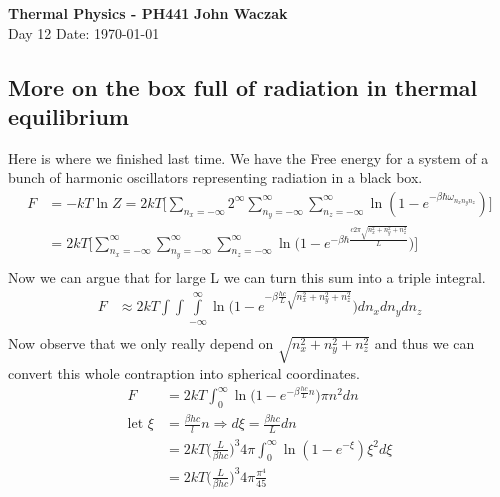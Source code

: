 \documentclass[a4paper, 11pt]{article}
\begin{document}
\noindent
\large\textbf{Thermal Physics - PH441} \hfill \textbf{John Waczak} \\
\normalsize Day 12 \hfill  Date: \today \\


\subsection*{More on the box full of radiation in thermal equilibrium}
	Here is where we finished last time. We have the Free energy for a system of a bunch of harmonic oscillators representing radiation in a black box.
		\begin{align*}
			F &= -kT\ln Z = 2kT\Big[\sum\limits_{n_x=-\infty}2^\infty\sum\limits_{n_y=-\infty}^\infty\sum\limits_{n_z=-\infty}^\infty\ln(1-e^{-\beta\hbar\omega_{n_xn_yn_z}})\Big]\\
			&= 2kT\Big[\sum\limits_{n_x=-\infty}^\infty\sum\limits_{n_y=-\infty}^\infty\sum\limits_{n_z=-\infty}^\infty\ln\Big(1-e^{-\beta\hbar\frac{c2\pi\sqrt{n_x^2+n_y^2+n_z^2}}{L}}\Big)\Big]\\
		\end{align*}
	\noindent Now we can argue that for large L we can turn this sum into a triple integral. 
		\begin{align*}
			F &\approx 2kT\int\int\int\limits_{-\infty}^\infty \ln\Big(1-e^{-\beta\frac{hc}{L}\sqrt{n_x^2+n_y^2+n_z^2}}\Big)dn_xdn_ydn_z \\ 
		\end{align*}
	\noindent Now observe that we only really depend on $\sqrt{n_x^2+n_y^2+n_z^2}$ and thus we can convert this whole contraption into spherical coordinates. 
		\begin{align*}
			F &= 2kT\int_0^{\infty}\ln\Big(1-e^{-\beta\frac{hc}{L}n}\Big)\pi n^2dn \\
			\text{let } \xi &= \frac{\beta h c}{l}n \Rightarrow d\xi = \frac{\beta h c}{L} dn \\ 
				&= 2kT\Big(\frac{L}{\beta h c}\Big)^3 4\pi \int_0^\infty \ln(1-e^{-\xi})\xi^2 d\xi \\
				&= 2kT\Big(\frac{L}{\beta h c}\Big)^3 4\pi \frac{\pi^4}{45}
		\end{align*}
\end{document}

